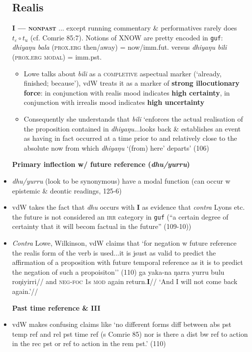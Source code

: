 \documentclass[10pt]{article}
\begin{document}
\begin{itemize}
			\subsection{Realis}
			\item[\textbf{I --- \textsc{nonpast}}]... except running commentary \& performatives rarely does $t_\varepsilon\circ t_u$ (cf. Comrie 85:7). Notions of XNOW are pretty encoded in \texttt{guf}: \textit{dhiyaŋu bala} (\textsc{prox.erg} then/away) = now/imm.fut. versus \textit{dhiyaŋu bili} (\textsc{prox.erg} \textsc{modal}) = imm.pst.
			\begin{itemize}
				\item Lowe talks about \textit{bili} as a \textsc{completive} aspectual marker (`already, finished; because'), vdW treats it as a marker of \textbf{strong illocutionary force}: in conjunction with realis mood indicates \textbf{high certainty}, in conjunction with irrealis mood indicates \textbf{high uncertainty}
				\item Consequently she understands that \textit{bili} `enforces the actual realisation of the proposition contained in \textit{dhiyaŋu}...looks back \& establishes an event as having in fact occurred at a time prior to and relatively close to the absolute now from which \textit{dhiyaŋu} `(from) here' departs' (106)
			\end{itemize}
		\item[\textbf{Primary inflection w/ future reference (\textit{dhu/yurru})}]
		\item \textit{dhu/yurru} (look to be synonymous) have a modal function (can occur w epistemic \& deontic readings, 125-6)
		\item vdW takes the fact that \textit{dhu} occurs with \textbf{I} as evidence that \textit{contra} Lyons etc. the future is not considered an \textsc{irr} category in \texttt{guf} (``a certain degree of certainty that it will becom factual in the future'' (109-10))
		\item \textit{Contra} Lowe, Wilkinson, vdW claims that `for negation w future reference the realis form of the verb is used...it is jsust as valid to predict the affirmation of a proposition with future temporal reference as it is to predict the negation of such a propoisiton'' (110)
		\pex\begingl\gla ga yaka-na ŋarra yurru bulu roŋiyirri//
		\glb and \textsc{neg-foc} 1s \textsc{mod} again return.\textbf{I}//
		\glft`And I will not come back again.'//\endgl\xe
	\item[\textbf{Past time reference \& III}] 
	\item vdW makes confusing claims like `no different forms diff between abs pst temp ref and rel pst time ref (s Comrie 85) nor is there a dist bw ref to action in the rec pst or ref to action in the rem pst.' (110)
	

\end{itemize}
\end{document}
